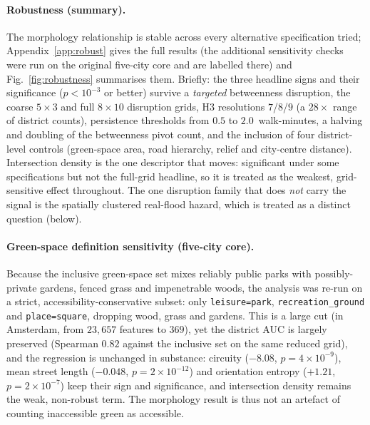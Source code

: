 \paragraph{Robustness (summary).} The morphology relationship is stable across every
alternative specification tried; Appendix~\ref{app:robust} gives the full results
(the additional sensitivity checks were run on the original five-city core and are
labelled there) and Fig.~\ref{fig:robustness} summarises them. Briefly: the three
headline signs and
their significance ($p<10^{-3}$ or better) survive a \emph{targeted} betweenness
disruption, the coarse $5\times3$ and full
$8\times10$ disruption grids, H3 resolutions $7$/$8$/$9$ (a $28\times$ range of
district counts), persistence thresholds from $0.5$ to $2.0$~walk-minutes, a halving
and doubling of the betweenness pivot count, and the inclusion of four
district-level controls (green-space area, road hierarchy, relief and city-centre
distance). Intersection density is the one descriptor that moves: significant under
some specifications but not the full-grid headline, so it is treated as the weakest,
grid-sensitive effect throughout. The one disruption family that does \emph{not}
carry the signal is the spatially clustered real-flood hazard, which is treated as a
distinct question (below).

\paragraph{Green-space definition sensitivity (five-city core).} Because the inclusive green-space set
mixes reliably public parks with possibly-private gardens, fenced grass and
impenetrable woods, the analysis was re-run on a strict, accessibility-conservative
subset: only \texttt{leisure=park}, \texttt{recreation\_ground} and
\texttt{place=square}, dropping wood, grass and gardens. This is a large cut (in
Amsterdam, from $23{,}657$ features to $369$), yet the district AUC is largely
preserved (Spearman $0.82$ against the inclusive set on the same reduced grid), and
the regression is unchanged in substance: circuity ($-8.08$, $p=4\times10^{-9}$),
mean street length ($-0.048$, $p=2\times10^{-12}$) and orientation entropy ($+1.21$,
$p=2\times10^{-7}$) keep their sign and significance, and intersection density
remains the weak, non-robust term. The morphology result is thus not an artefact of
counting inaccessible green as accessible.

